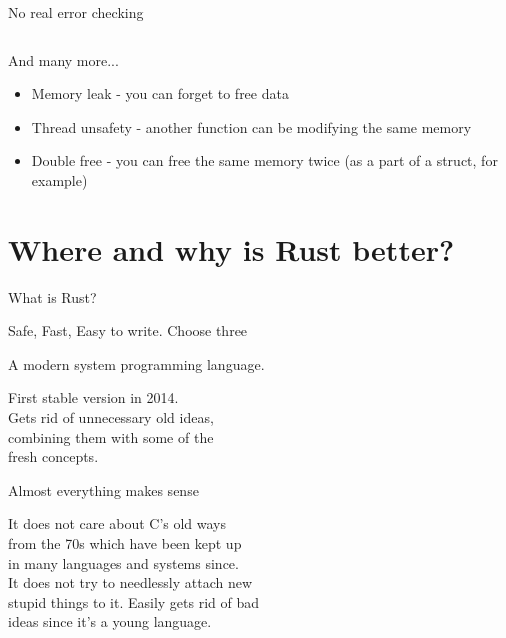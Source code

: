 \documentclass[usenames,dvipsnames,10pt,aspectratio=169]{beamer}
\begin{document}
\begin{frame}{No real error checking} 
	\inputminted[fontsize=\large]{c}{code/errorcheck.c}
\end{frame}

\begin{frame}{And many more...}
	\large
	\begin{itemize}
		\item Memory leak - you can forget to free data
		\item Thread unsafety - another function can be modifying the same memory
		\item Double free - you can free the same memory twice (as a part of a struct, for example)
	\end{itemize}
\end{frame}



\section{Where and why is Rust better?}

\begin{frame}{What is Rust?}

	\LARGE{\textcolor{ucuyellow}{Safe, Fast, Easy to write. Choose three}}

\vspace{0.8cm}
\large
A modern system programming language.

\vspace{0.3cm}

First stable version in 2014.\\
Gets rid of unnecessary old ideas, \\
combining them with some of the\\
fresh concepts.
\end{frame}

\begin{frame}{Almost everything makes sense} 

\large
It does not care about C’s old ways\\ 
from the 70s which have been kept up \\
in many languages and systems since.\\ 

\vspace{0.3cm}
It does not try to needlessly attach new\\ 
stupid things to it. Easily gets rid of bad\\ 
ideas since it’s a young language.\\
\end{frame}
\end{document}
